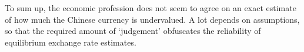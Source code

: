 \begin{description}
To sum up, the economic profession does not seem to agree on an exact estimate of how much the Chinese currency is undervalued. A lot depends on assumptions, so that the required amount of `judgement' obfuscates the reliability of equilibrium exchange rate estimates. 
 
 









\end{description}
